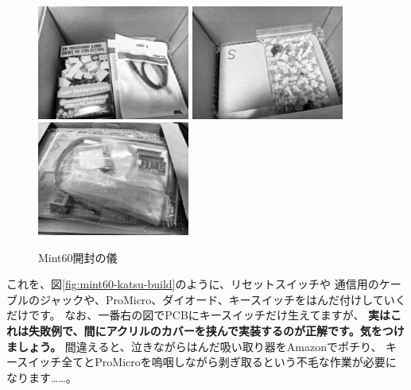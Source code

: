 \documentclass[mingoth,a4paper]{jsarticle}
\begin{document}
\begin{figure}[htbp]
 \begin{center}
  \includegraphics[keepaspectratio,width=5cm]{./image201911-kansai-02/mint60-unpack-01.jpg}
  \hspace*{2zw}
  \includegraphics[keepaspectratio,width=5cm]{./image201911-kansai-02/mint60-unpack-02.jpg}
  \hspace*{2zw}
  \includegraphics[keepaspectratio,width=5cm]{./image201911-kansai-02/mint60-unpack-03.jpg}
 \end{center}
 \vspace*{-1zw}
 \caption{Mint60開封の儀}
 \label{fig:mint60-katsu-unpack}
\end{figure}

これを、図\ref{fig:mint60-katsu-build}のように、リセットスイッチや
通信用のケーブルのジャックや、ProMicro、ダイオード、キースイッチをはんだ付けしていくだけです。
なお、一番右の図でPCBにキースイッチだけ生えてますが、
\textbf{実はこれは失敗例で、間にアクリルのカバーを挟んで実装するのが正解です。気をつけましょう。}
間違えると、泣きながらはんだ吸い取り器をAmazonでポチり、
キースイッチ全てとProMicroを嗚咽しながら剥ぎ取るという不毛な作業が必要になります……。
\end{document}
